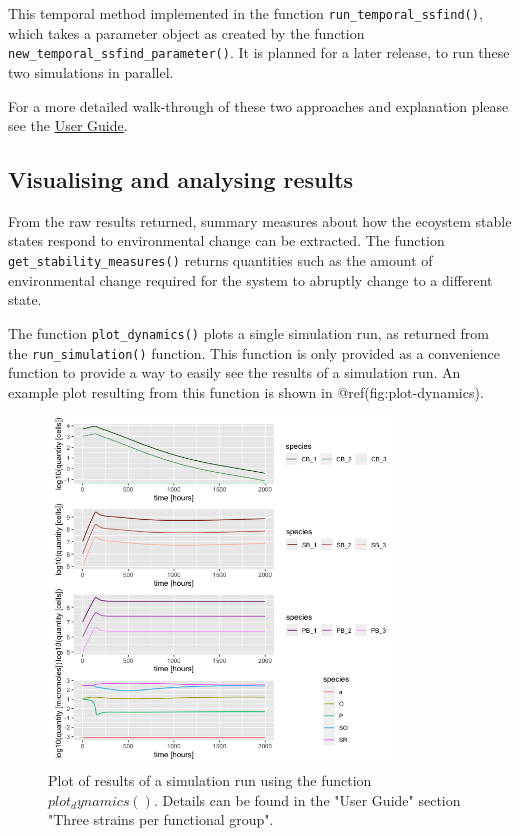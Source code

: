 \documentclass[]{elsarticle} %
\begin{document}
This temporal method implemented in the function
\texttt{run\_temporal\_ssfind()}, which takes a parameter object as
created by the function \texttt{new\_temporal\_ssfind\_parameter()}. It
is planned for a later release, to run these two simulations in
parallel.

For a more detailed walk-through of these two approaches and explanation
please see the \href{@LINK_NEEDED}{User Guide}.

\hypertarget{visualising-and-analysing-results}{%
\subsection{Visualising and analysing
results}\label{visualising-and-analysing-results}}

From the raw results returned, summary measures about how the ecoystem
stable states respond to environmental change can be extracted. The
function \texttt{get\_stability\_measures()} returns quantities such as
the amount of environmental change required for the system to abruptly
change to a different state.

The function \texttt{plot\_dynamics()} plots a single simulation run, as
returned from the \texttt{run\_simulation()} function. This function is
only provided as a convenience function to provide a way to easily see
the results of a simulation run. An example plot resulting from this
function is shown in @ref(fig:plot-dynamics).

\begin{figure}

{\centering \includegraphics[width=350px]{figures/ug_three_strains_dynamics} 

}

\caption{Plot of results of a simulation run using the function $plot_dynamics()$. Details can be found in the "User Guide" section "Three strains per functional group".}\label{fig:plot-dynamics}
\end{figure}
\end{document}
